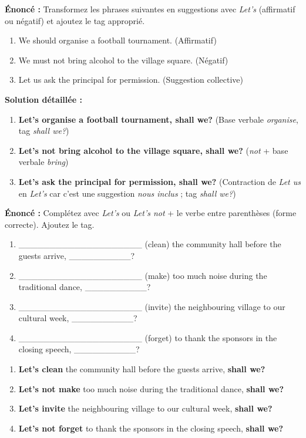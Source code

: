 \documentclass[11pt]{article}
\begin{document}
\begin{exoresolu}
\textbf{Énoncé :} Transformez les phrases suivantes en suggestions avec \emph{Let's} (affirmatif ou négatif) et ajoutez le tag approprié.
\begin{enumerate}
    \item We should organise a football tournament. (Affirmatif)
    \item We must not bring alcohol to the village square. (Négatif)
    \item Let us ask the principal for permission. (Suggestion collective)
\end{enumerate}
\tcblower
\textbf{Solution détaillée :}
\begin{enumerate}
    \item \textbf{Let's organise a football tournament, shall we?} (Base verbale \emph{organise}, tag \emph{shall we?})
    \item \textbf{Let's not bring alcohol to the village square, shall we?} (\emph{not} + base verbale \emph{bring})
    \item \textbf{Let's ask the principal for permission, shall we?} (Contraction de \emph{Let us} en \emph{Let's} car c'est une suggestion \emph{nous inclus} ; tag \emph{shall we?})
\end{enumerate}
\end{exoresolu}

\begin{exercice}
\textbf{Énoncé :} Complétez avec \emph{Let's} ou \emph{Let's not} + le verbe entre parenthèses (forme correcte). Ajoutez le tag.
\begin{enumerate}
    \item \_\_\_\_\_\_\_\_\_\_\_\_\_\_\_\_\_\_\_\_ (clean) the community hall before the guests arrive, \_\_\_\_\_\_\_\_\_\_?
    \item \_\_\_\_\_\_\_\_\_\_\_\_\_\_\_\_\_\_\_\_ (make) too much noise during the traditional dance, \_\_\_\_\_\_\_\_\_\_?
    \item \_\_\_\_\_\_\_\_\_\_\_\_\_\_\_\_\_\_\_\_ (invite) the neighbouring village to our cultural week, \_\_\_\_\_\_\_\_\_\_?
    \item \_\_\_\_\_\_\_\_\_\_\_\_\_\_\_\_\_\_\_\_ (forget) to thank the sponsors in the closing speech, \_\_\_\_\_\_\_\_\_\_?
\end{enumerate}
\end{exercice}

\begin{corrige}[Exercice n°1]
\begin{enumerate}
    \item \textbf{Let's clean} the community hall before the guests arrive, \textbf{shall we?}
    \item \textbf{Let's not make} too much noise during the traditional dance, \textbf{shall we?}
    \item \textbf{Let's invite} the neighbouring village to our cultural week, \textbf{shall we?}
    \item \textbf{Let's not forget} to thank the sponsors in the closing speech, \textbf{shall we?}
\end{enumerate}
\end{corrige}
\end{document}
